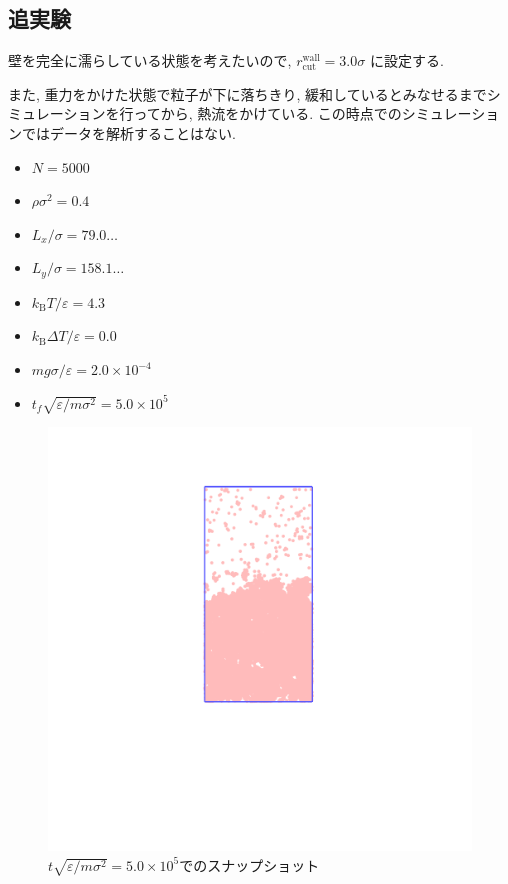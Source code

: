 \subsection{追実験}

壁を完全に濡らしている状態を考えたいので, $r^{\text{wall}}_{\text{cut}}=3.0\sigma$ に設定する.

また, 重力をかけた状態で粒子が下に落ちきり, 緩和しているとみなせるまでシミュレーションを行ってから, 熱流をかけている. この時点でのシミュレーションではデータを解析することはない.

\begin{itemize}
  \item $N = 5000$
  \item $\rho \sigma^2 = 0.4$
  \item $L_x / \sigma = 79.0\dots$
  \item $L_y / \sigma = 158.1\dots$
  \item $k_{\text{B}} T/\varepsilon = 4.3$
  \item $k_{\text{B}} \Delta T/\varepsilon = 0.0$
  \item $mg\sigma/\varepsilon = 2.0 \times 10^{-4}$
  \item $t_f \sqrt{\varepsilon / m \sigma^2} = 5.0 \times 10^{5}$
\end{itemize}

\begin{figure}[H]
  \centering
  \includegraphics[scale=0.2]{image/drop5000.png}
  \caption{$t \sqrt{\varepsilon / m \sigma^2} = 5.0 \times 10^{5}$でのスナップショット}
  \label{}
\end{figure}

